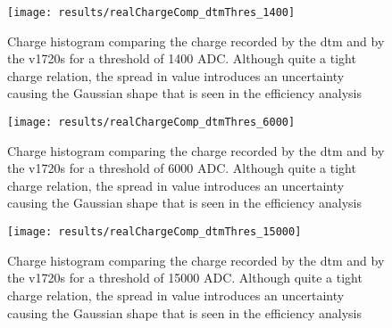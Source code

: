 \clearpage
\begin{figure}
\centering
\texttt{[image: results/realChargeComp\_dtmThres\_1400]}
\caption{Charge histogram comparing the charge recorded by the \gls{dtm} and by the \gls{v1720}s for a threshold of 1400 ADC. Although quite a tight charge relation, the spread in value introduces an uncertainty causing the Gaussian shape that is seen in the efficiency analysis}
\label{Fig:charge1400}
\end{figure}
\begin{figure}
\centering
\texttt{[image: results/realChargeComp\_dtmThres\_6000]}
\caption{Charge histogram comparing the charge recorded by the \gls{dtm} and by the \gls{v1720}s for a threshold of 6000 ADC. Although quite a tight charge relation, the spread in value introduces an uncertainty causing the Gaussian shape that is seen in the efficiency analysis}
\label{Fig:charge6000}
\end{figure}
\begin{figure}
\centering
\texttt{[image: results/realChargeComp\_dtmThres\_15000]}
\caption{Charge histogram comparing the charge recorded by the \gls{dtm} and by the \gls{v1720}s for a threshold of 15000 ADC. Although quite a tight charge relation, the spread in value introduces an uncertainty causing the Gaussian shape that is seen in the efficiency analysis}
\label{Fig:charge15000}
\end{figure}
\clearpage


